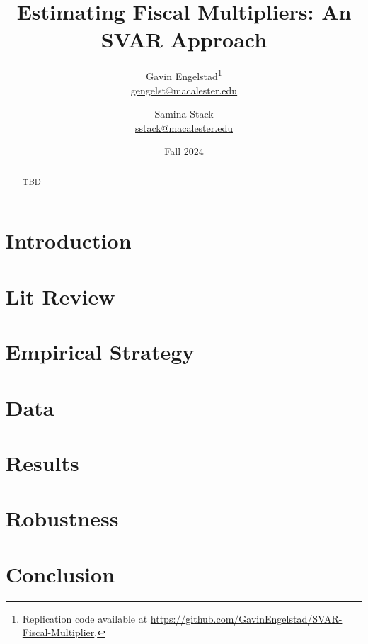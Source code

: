 \documentclass[11pt]{article}
\title{Estimating Fiscal Multipliers: An SVAR Approach}
\author{Gavin Engelstad\thanks{Replication code available at \url{https://github.com/GavinEngelstad/SVAR-Fiscal-Multiplier}.} \\ \href{mailto:gengelst@macalester.edu}{gengelst@macalester.edu} \and Samina Stack \\ \href{mailto:sstack@macalester.edu}{sstack@macalester.edu}}
\date{Fall 2024}
\numberwithin{equation}{section} %
\numberwithin{figure}{section} %
\numberwithin{table}{section} %
\begin{document}
\maketitle

\begin{abstract}
    TBD
\end{abstract}

\section{Introduction} \label{sec:intro}


\section{Lit Review} \label{sec:lit}


\section{Empirical Strategy} \label{sec:emp}


\section{Data} \label{sec:data}


\section{Results} \label{sec:results}


\section{Robustness} \label{sec:robust}


\section{Conclusion} \label{sec:concl}



\newpage
\printbibliography
\FloatBarrier



% 
\end{document}
